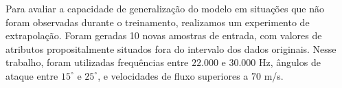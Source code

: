 \documentclass[12pt,a4paper,oneside]{report}
\newcommand{\degree}{^{\circ}}
\begin{document}
%	
%	
%	
%	
%	
%	

Para avaliar a capacidade de generalização do modelo em situações que não foram observadas durante o treinamento, realizamos um experimento de extrapolação. Foram geradas 10 novas amostras de entrada, com valores de atributos propositalmente situados fora do intervalo dos dados originais. Nesse trabalho, foram utilizadas frequências entre $22.000$ e $30.000$ Hz, ângulos de ataque entre $15\degree$ e $25\degree$, e velocidades de fluxo superiores a $70$ m/s.
\end{document}
